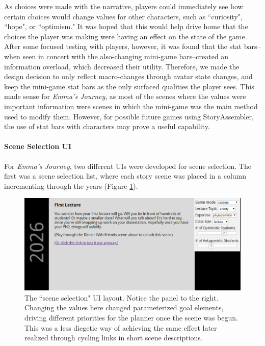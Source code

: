 
As choices were made with the narrative, players could immediately see how certain choices would change values for other characters, such as ``curiosity", ``hope", or ``optimism." It was hoped that this would help drive home that the choices the player was making were having an effect on the state of the game. After some focused testing with players, however, it was found that the stat bars--when seen in concert with the also-changing mini-game bars--created an information overload, which decreased their utility. Therefore, we made the design decision to only reflect macro-changes through avatar state changes, and keep the mini-game stat bars as the only surfaced qualities the player sees. This made sense for \textit{Emma's Journey}, as most of the scenes where the values were important information were scenes in which the mini-game was the main method used to modify them. However, for possible future games using StoryAssembler, the use of stat bars with characters may prove a useful capability.

\paragraph{Scene Selection UI}

For \textit{Emma's Journey}, two different UIs were developed for scene selection. The first was a scene selection list, where each story scene was placed in a column incrementing through the years (Figure \ref{fig:scene-ui-proto}).


\begin{figure}
    \centering
    \includegraphics[width=\textwidth]{figures/3-StoryAssembler/proto-UI.png}
    \caption{The ``scene selection" UI layout. Notice the panel to the right. Changing the values here changed parameterized goal elements, driving different priorities for the planner once the scene was begun. This was a less diegetic way of achieving the same effect later realized through cycling links in short scene descriptions.}
    \label{fig:scene-ui-proto}
\end{figure}

